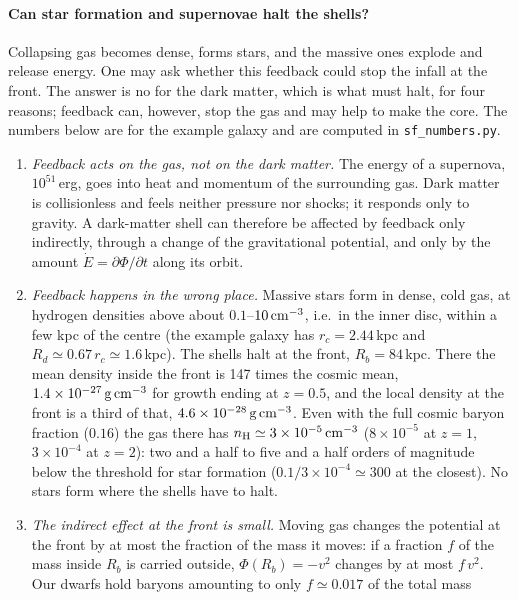 \documentclass[11pt,a4paper]{article}
\begin{document}
\paragraph{Can star formation and supernovae halt the shells?} Collapsing gas becomes
dense, forms stars, and the massive ones explode and release energy. One may ask
whether this feedback could stop the infall at the front. The answer is no for the
dark matter, which is what must halt, for four reasons; feedback can, however, stop
the gas and may help to make the core. The numbers below are for the example galaxy
and are computed in \texttt{sf\_numbers.py}.
\begin{enumerate}
\item \emph{Feedback acts on the gas, not on the dark matter.} The energy of a
  supernova, $10^{51}$\,erg, goes into heat and momentum of the surrounding gas.
  Dark matter is collisionless and feels neither pressure nor shocks; it responds only
  to gravity. A dark-matter shell can therefore be affected by feedback only
  indirectly, through a change of the gravitational potential, and only by the
  amount $\dot E=\partial\Phi/\partial t$ along its orbit.
\item \emph{Feedback happens in the wrong place.} Massive stars form in dense, cold
  gas, at hydrogen densities above about $0.1$--$10\,{\rm cm^{-3}}$, i.e.\ in the
  inner disc, within a few kpc of the centre (the example galaxy has
  $r_c=2.44$\,kpc and $R_d\simeq0.67\,r_c\simeq1.6$\,kpc). The shells halt at the
  front, $R_b=84$\,kpc. There the mean density inside the front is 147 times the
  cosmic mean, $1.4\times10^{-27}\,{\rm g\,cm^{-3}}$ for growth ending at $z=0.5$, and
  the local density at the front is a third of that,
  $4.6\times10^{-28}\,{\rm g\,cm^{-3}}$. Even with the full cosmic baryon fraction
  ($0.16$) the gas there has $n_{\rm H}\simeq3\times10^{-5}\,{\rm cm^{-3}}$
  ($8\times10^{-5}$ at $z=1$, $3\times10^{-4}$ at $z=2$): two and a half to five and a half orders of
  magnitude below the threshold for star formation ($0.1/3\times10^{-4}\simeq300$ at the closest). No stars form where the shells
  have to halt.
\item \emph{The indirect effect at the front is small.} Moving gas changes the
  potential at the front by at most the fraction of the mass it moves: if a fraction
  $f$ of the mass inside $R_b$ is carried outside, $\Phi(R_b)=-v^2$ changes by at most
  $f\,v^2$. Our dwarfs hold baryons amounting to only $f\simeq0.017$ of the total mass

\end{enumerate}
\end{document}
